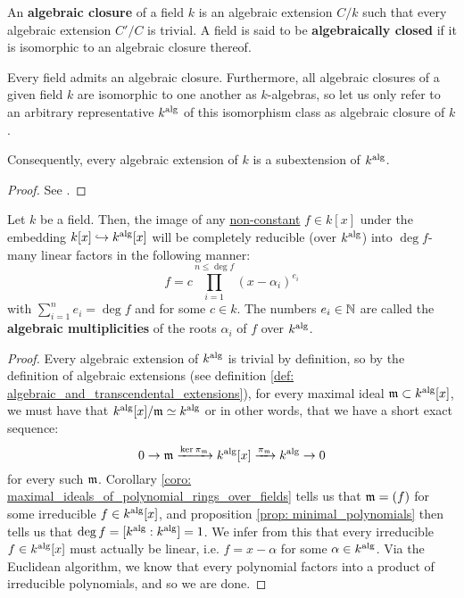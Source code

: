         \begin{definition} \label{def: algebraic_closures}
            An \textbf{algebraic closure} of a field $k$ is an algebraic extension $C/k$ such that every algebraic extension $C'/C$ is trivial. A field is said to be \textbf{algebraically closed} if it is isomorphic to an algebraic closure thereof.
        \end{definition}
        \begin{theorem} \label{theorem: existence_and_uniqueness_of_algebraic_closures}
            Every field admits an algebraic closure. Furthermore, all algebraic closures of a given field $k$ are isomorphic to one another as $k$-algebras, so let us only refer to an arbitrary representative $k^{\mathrm{alg}}$ of this isomorphism class as  algebraic closure of $k$.

            Consequently, every algebraic extension of $k$ is a subextension of $k^{\mathrm{alg}}$.
        \end{theorem}
            \begin{proof}
                See \cite[\href{https://stacks.math.columbia.edu/tag/09GT}{Tag 09GT}]{stacks}.
            \end{proof}
        \begin{proposition} \label{prop: algebraic_closures_contain_all_roots}
            Let $k$ be a field. Then, the image of any \underline{non-constant} $f \in k[x]$ under the embedding $k[x] \hookrightarrow k^{\mathrm{alg}}[x]$ will be completely reducible (over $k^{\mathrm{alg}}$) into $\deg f$-many linear factors in the following manner:
                $$f = c \prod_{i = 1}^{n \leq \deg f} (x - \alpha_i)^{e_i}$$
            with $\sum_{i = 1}^n e_i = \deg f$ and for some $c \in k$. The numbers $e_i \in \mathbb{N}$ are called the \textbf{algebraic multiplicities} of the roots $\alpha_i$ of $f$ over $k^{\mathrm{alg}}$.
        \end{proposition}
            \begin{proof}
                Every algebraic extension of $k^{\mathrm{alg}}$ is trivial by definition, so by the definition of algebraic extensions (see definition \ref{def: algebraic_and_transcendental_extensions}), for every maximal ideal $\mathfrak{m} \subset k^{\mathrm{alg}}[x]$, we must have that $k^{\mathrm{alg}}[x]/\mathfrak{m} \simeq k^{\mathrm{alg}}$ or in other words, that we have a short exact sequence:
                    $$0 \to \mathfrak{m} \xrightarrow[]{\ker \pi_{\mathfrak{m}}} k^{\mathrm{alg}}[x] \xrightarrow[]{\pi_{\mathfrak{m}}} k^{\mathrm{alg}} \to 0$$
                for every such $\mathfrak{m}$. Corollary \ref{coro: maximal_ideals_of_polynomial_rings_over_fields} tells us that $\mathfrak{m} = (f)$ for some irreducible $f \in k^{\mathrm{alg}}[x]$, and proposition \ref{prop: minimal_polynomials} then tells us that $\deg f = [k^{\mathrm{alg}} : k^{\mathrm{alg}}] = 1$. We infer from this that every irreducible $f \in k^{\mathrm{alg}}[x]$ must actually be linear, i.e. $f = x - \alpha$ for some $\alpha \in k^{\mathrm{alg}}$. Via the Euclidean algorithm, we know that every polynomial factors into a product of irreducible polynomials, and so we are done.
            \end{proof}

